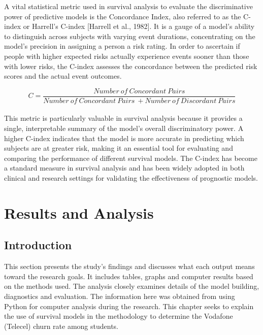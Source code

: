 \documentclass[doublespacing,12pt]{report}
\begin{document}
A vital statistical metric used in survival analysis to evaluate the discriminative power of predictive models is the Concordance Index, also referred to as the C-index or Harrell's C-index [Harrell et al., 1982]. It is a gauge of a model's ability to distinguish across subjects with varying event durations, concentrating on the model's precision in assigning a person a risk rating.
In order to ascertain if people with higher expected risks actually experience events sooner than those with lower risks, the C-index assesses the concordance between the predicted risk scores and the actual event outcomes.

\begin{equation}
C=\frac{Number\ of\ Concordant\ Pairs}{Number\ of\ Concordant\ Pairs\ +Number\ of\ Discordant\ Pairs}
\end{equation}\\
This metric is particularly valuable in survival analysis because it provides a single, interpretable summary of the model's overall discriminatory power. A higher C-index indicates that the model is more accurate in predicting which subjects are at greater risk, making it an essential tool for evaluating and comparing the performance of different survival models. The C-index has become a standard measure in survival analysis and has been widely adopted in both clinical and research settings for validating the effectiveness of prognostic models.



\newpage
\chapter{Results and Analysis}
\section{Introduction}
This section presents the study's findings and discusses what each output means toward the research goals. It includes tables, graphs and computer results based on the methods used. The analysis closely examines details of the model building, diagnostics and evaluation. The information here was obtained from using Python for computer analysis during the research. This chapter seeks to explain the use of survival models in the methodology to determine the Vodafone (Telecel) churn rate among students.
\end{document}
